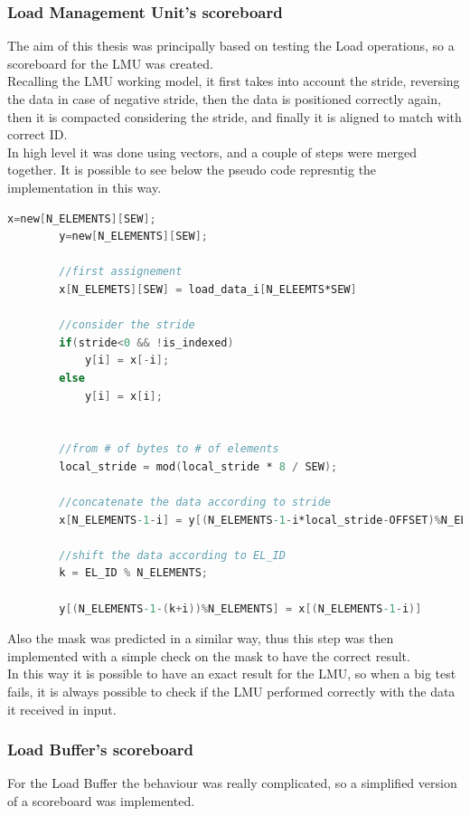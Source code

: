 \subsubsection{Load Management Unit's scoreboard}
The aim of this thesis was principally based on testing the Load operations, so a scoreboard for the LMU was created.\\

Recalling the LMU working model, it first takes into account the stride, reversing the data in case of negative stride, then the data is positioned correctly again, then it is compacted considering the stride, and finally it is aligned to match with correct ID.\\

In high level it was done using vectors, and a couple of steps were merged together. It is possible to see below the pseudo code represntig the implementation in this way.

\begin{lstlisting}[language=Verilog,style=verilog-style]
        x=new[N_ELEMENTS][SEW];
        y=new[N_ELEMENTS][SEW];

        //first assignement
        x[N_ELEMETS][SEW] = load_data_i[N_ELEEMTS*SEW]

        //consider the stride
        if(stride<0 && !is_indexed)
            y[i] = x[-i];
        else
            y[i] = x[i];
        

        //from # of bytes to # of elements
        local_stride = mod(local_stride * 8 / SEW);

        //concatenate the data according to stride 
        x[N_ELEMENTS-1-i] = y[(N_ELEMENTS-1-i*local_stride-OFFSET)%N_ELEMENTS];

        //shift the data according to EL_ID
        k = EL_ID % N_ELEMENTS;
        
        y[(N_ELEMENTS-1-(k+i))%N_ELEMENTS] = x[(N_ELEMENTS-1-i)]
\end{lstlisting}

Also the mask was predicted in a similar way, thus this step was then implemented with a simple check on the mask to have the correct result.\\

In this way it is possible to have an exact result for the LMU, so when a big test fails, it is always possible to check if the LMU performed correctly with the data it received in input.\\

\subsubsection{Load Buffer's scoreboard}
For the Load Buffer the behaviour was really complicated, so a simplified  version of a scoreboard was implemented.\\

